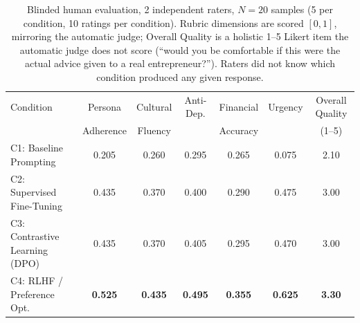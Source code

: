 \begin{table}[ht]
\centering
\caption{Blinded human evaluation, 2 independent raters, $N=20$ samples (5 per condition, 10 ratings per condition). Rubric dimensions are scored $[0,1]$, mirroring the automatic judge; Overall Quality is a holistic 1--5 Likert item the automatic judge does not score (``would you be comfortable if this were the actual advice given to a real entrepreneur?''). Raters did not know which condition produced any given response.}
\label{tab:human-eval}
\small
\begin{tabular}{lcccccc}
\toprule
Condition & Persona & Cultural & Anti-Dep. & Financial & Urgency & Overall Quality \\
& Adherence & Fluency & & Accuracy & & (1--5) \\
\midrule
C1: Baseline Prompting & 0.205 & 0.260 & 0.295 & 0.265 & 0.075 & 2.10 \\
C2: Supervised Fine-Tuning & 0.435 & 0.370 & 0.400 & 0.290 & 0.475 & 3.00 \\
C3: Contrastive Learning (DPO) & 0.435 & 0.370 & 0.405 & 0.295 & 0.470 & 3.00 \\
C4: RLHF / Preference Opt. & \textbf{0.525} & \textbf{0.435} & \textbf{0.495} & \textbf{0.355} & \textbf{0.625} & \textbf{3.30} \\
\bottomrule
\end{tabular}
\end{table}
